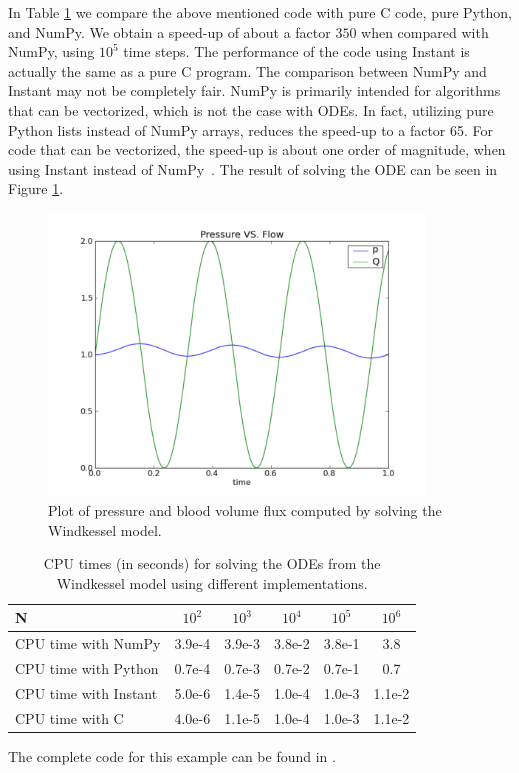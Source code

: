 In Table \ref{wilbers:fig:speed-up} we compare the above mentioned
code with pure C code, pure Python, and NumPy.  We obtain a speed-up
of about a factor $350$ when compared with NumPy, using $10^5$ time
steps. The performance of the code using Instant is actually the same
as a pure C program.  The comparison between NumPy and Instant may not
be completely fair. NumPy is primarily intended for algorithms that
can be vectorized, which is not the case with ODEs. In fact, utilizing
pure Python lists instead of NumPy arrays, reduces the speed-up to a
factor 65. For code that can be vectorized, the speed-up is about one
order of magnitude, when using Instant instead of
NumPy~\citep{WilbersLangtangenOdegaard2009}. The result of solving the
ODE can be seen in Figure
\ref{wilbers:fig:fig1}.

\begin{figure}
\begin{center}
\includegraphics[width=100mm]{chapters/wilbers/pdf/pressure_plot.pdf}
\caption{Plot of pressure and blood volume flux computed by solving the Windkessel model.}
\label{wilbers:fig:fig1}
\end{center}
\end{figure}

\begin{table}
\begin{center}
\begin{tabular}{|l|c|c|c|c|c|} \hline
N                     & $10^2$     & $10^3$ & $10^4$ &  $10^5$ &  $10^6$ \\ \hline
CPU time with NumPy   & 3.9e-4  & 3.9e-3 & 3.8e-2 & 3.8e-1 & 3.8     \\ \hline
CPU time with Python  & 0.7e-4  & 0.7e-3 & 0.7e-2 & 0.7e-1 & 0.7     \\ \hline
CPU time with Instant & 5.0e-6  & 1.4e-5 & 1.0e-4 & 1.0e-3 & 1.1e-2  \\ \hline
CPU time with C       & 4.0e-6  & 1.1e-5 & 1.0e-4 & 1.0e-3 & 1.1e-2  \\ \hline
\end{tabular}
\caption{CPU times (in seconds) for solving the ODEs from the  Windkessel model using different implementations.}
\label{wilbers:fig:speed-up}
\end{center}
\end{table}
The complete code for this example can be found in .


